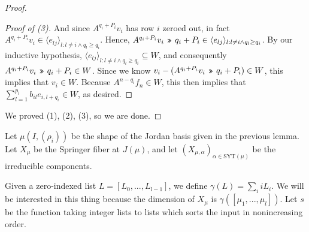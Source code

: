 \documentclass[12pt,psamsfonts]{article}
\newcommand{\leftshift}{\,\texttt{<<}\,}
\newcommand{\rightshift}{\mathbin{\rotatebox[origin=c]{180}{\leftshift}}}
\begin{document}
\begin{proof}
\begin{proof}[Proof of (3)]
        And since \(A^{q_i + P_i} v_i\) has row \(i\) zeroed out, in fact \(A^{q_i + P_i} v_i \in \langle e_{lj} \rangle_{l : l \neq i \land q_l \geq q_i}\).
        Hence, \(A^{q_i + P_i} v_i \rightshift q_i + P_i \in \langle e_{lj} \rangle_{l : l \neq i \land q_l \geq q_i}\).
        By our inductive hypothesis, \(\langle e_{lj} \rangle_{l : l \neq i \land q_l \geq q_i} \subseteq W\), and consequently \(A^{q_i + P_i} v_i \rightshift q_i + P_i \in W\).
        Since we know \(v_i - (A^{q_i + P_i} v_i \rightshift q_i + P_i) \in W\), this implies that \(v_i \in W\).
        Because \(A^{n - q_i} f_n \in W\), this then implies that \(\sum_{l = 1}^{p_i} b_{il} e_{i,l + q_i} \in W\), as desired.
    \end{proof}
    We proved (1), (2), (3), so we are done.
\end{proof}

Let \(\mu(I, (\rho_i))\) be the shape of the Jordan basis given in the previous lemma.
Let \(X_\mu\) be the Springer fiber at \(J(\mu)\), and let \((X_{\mu, \alpha})_{\alpha \in \mathrm{SYT}(\mu)}\) be the irreducible components.
\par Given a zero-indexed list \(L = [L_0, ..., L_{l - 1}]\), we define \(\gamma(L) = \sum_i i L_i\).
We will be interested in this thing because the dimension of \(X_\mu\) is \(\gamma([\mu_1, ..., \mu_l])\).
Let \(s\) be the function taking integer lists to lists which sorts the input in nonincreasing order.
\end{document}
